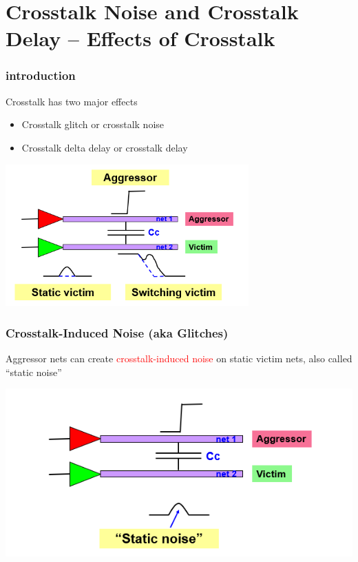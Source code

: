 \documentclass{beamer}
\begin{document}
	\section{Crosstalk Noise and Crosstalk Delay – Effects of Crosstalk}	
	\begin{frame}
		\frametitle{introduction}
	Crosstalk has two major effects
		\begin{block}
		
		\begin{itemize}
			\item Crosstalk glitch or crosstalk noise
			\item Crosstalk delta delay or crosstalk delay
		\end{itemize}
		\end{block}
		\begin{center}
		\includegraphics[width= 0.7\textwidth]{Crosstalk_wafe}
	\end{center}
	\end{frame}	
	
	\begin{frame}
		\frametitle{Crosstalk-Induced Noise (aka Glitches)}
			\begin{alertblock}
			
				Aggressor nets can create \textcolor{red} {crosstalk-induced noise} on static victim nets, also called “static noise”
				
			\end{alertblock}
		\begin{center}
			\includegraphics[width=0.9\textheight]{static_noise}
		\end{center}

	\end{frame}
	
\end{document}
